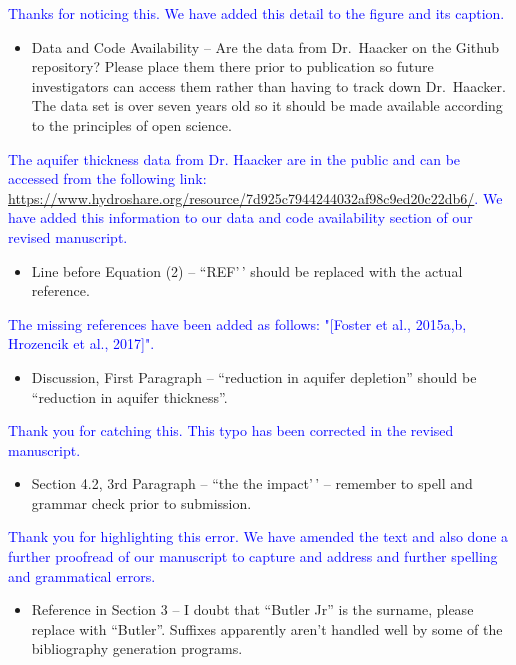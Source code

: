 \documentclass[
]{article}
\providecommand{\tightlist}{%
  \setlength{\itemsep}{0pt}\setlength{\parskip}{0pt}}
\begin{document}
\textcolor{blue}{Thanks for noticing this. We have added this detail to the figure and its caption.}

\begin{itemize}
\tightlist
\item
  Data and Code Availability -- Are the data from Dr.~Haacker on the
  Github repository? Please place them there prior to publication so
  future investigators can access them rather than having to track down
  Dr.~Haacker. The data set is over seven years old so it should be made
  available according to the principles of open science.
\end{itemize}

\textcolor{blue}{The aquifer thickness data from Dr. Haacker are in the public and can be accessed from the following link: \url{https://www.hydroshare.org/resource/7d925c7944244032af98c9ed20c22db6/}. We have added this information to our data and code availability section of our revised manuscript.}

\begin{itemize}
\tightlist
\item
  Line before Equation (2) -- ``REF'\,' should be replaced with the
  actual reference.
\end{itemize}

\textcolor{blue}{The missing references have been added as follows: "[Foster et al., 2015a,b, Hrozencik et al., 2017]".}

\begin{itemize}
\tightlist
\item
  Discussion, First Paragraph -- ``reduction in aquifer depletion'' should be ``reduction in aquifer thickness''.
\end{itemize}

\textcolor{blue}{Thank you for catching this. This typo has been corrected in the revised manuscript.}

\begin{itemize}
\tightlist
\item
  Section 4.2, 3rd Paragraph -- ``the the impact'\,' -- remember to
  spell and grammar check prior to submission.
\end{itemize}

\textcolor{blue}{Thank you for highlighting this error. We have amended the text and also done a further proofread of our manuscript to capture and address and further spelling and grammatical errors.}

\begin{itemize}
\tightlist
\item
  Reference in Section 3 -- I doubt that ``Butler Jr'' is the surname, please replace with ``Butler''. Suffixes apparently aren't handled well by some of the bibliography generation programs.
\end{itemize}
\end{document}
